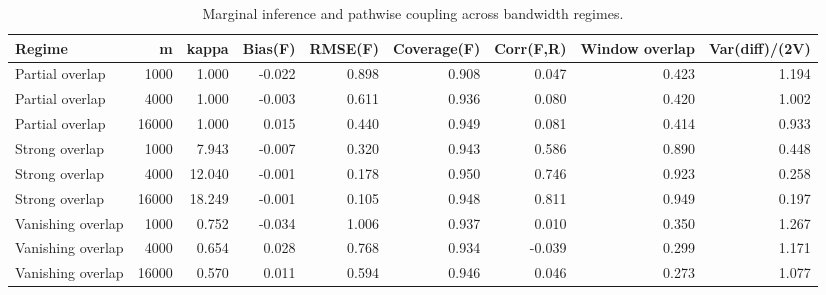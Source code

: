\begin{table}[!htbp]
\centering
\caption{Marginal inference and pathwise coupling across bandwidth regimes.}
\label{tab:large-cluster-simulation}
\begin{tabular}{lrrrrrrrr}
\toprule
Regime & m & kappa & Bias(F) & RMSE(F) & Coverage(F) & Corr(F,R) & Window overlap & Var(diff)/(2V) \\
\midrule
Partial overlap & 1000 & 1.000 & -0.022 & 0.898 & 0.908 & 0.047 & 0.423 & 1.194 \\
Partial overlap & 4000 & 1.000 & -0.003 & 0.611 & 0.936 & 0.080 & 0.420 & 1.002 \\
Partial overlap & 16000 & 1.000 & 0.015 & 0.440 & 0.949 & 0.081 & 0.414 & 0.933 \\
Strong overlap & 1000 & 7.943 & -0.007 & 0.320 & 0.943 & 0.586 & 0.890 & 0.448 \\
Strong overlap & 4000 & 12.040 & -0.001 & 0.178 & 0.950 & 0.746 & 0.923 & 0.258 \\
Strong overlap & 16000 & 18.249 & -0.001 & 0.105 & 0.948 & 0.811 & 0.949 & 0.197 \\
Vanishing overlap & 1000 & 0.752 & -0.034 & 1.006 & 0.937 & 0.010 & 0.350 & 1.267 \\
Vanishing overlap & 4000 & 0.654 & 0.028 & 0.768 & 0.934 & -0.039 & 0.299 & 1.171 \\
Vanishing overlap & 16000 & 0.570 & 0.011 & 0.594 & 0.946 & 0.046 & 0.273 & 1.077 \\
\bottomrule
\end{tabular}
\end{table}

